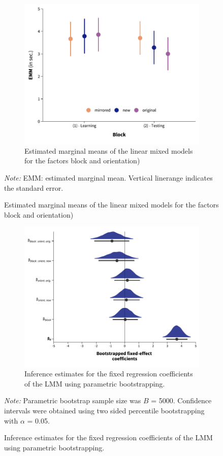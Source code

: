 \documentclass[
  man,floatsintext]{apa7}
\begin{document}
\begin{figure}[H]

\begin{figure}

\caption{Estimated marginal means of the linear mixed models for the factors block and orientation)
\label{fig:marginal-mean}}

{\centering \includegraphics[width=0.7\linewidth]{../results/figures/marginal_means} 

}

\end{figure}


\begingroup
\footnotesize
\textit{Note:} EMM: estimated marginal mean. Vertical linerange indicates the standard error.
\endgroup
\end{figure}

\begin{figure}[H]

\begin{figure}

\caption{Inference estimates for the fixed regression coefficients of the LMM using parametric bootstrapping. \label{fig:bootstrap}}

{\centering \includegraphics[width=0.8\linewidth]{../results/figures/bootstrapped_weights} 

}

\end{figure}


\begingroup
\footnotesize
\textit{Note:} Parametric bootstrap sample size was $B$ = 5000. Confidence intervals were obtained using two sided percentile bootstrapping with  $\alpha$ = 0.05.
\endgroup
\end{figure}
\end{document}
